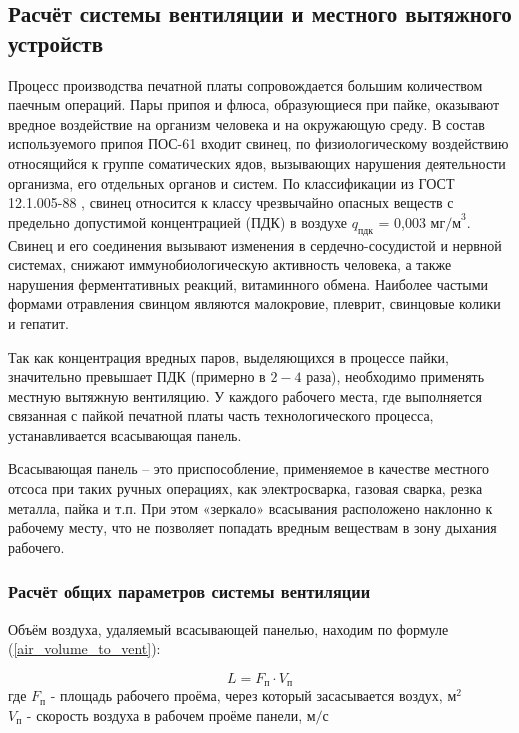 \newpage

\subsection{Расчёт системы вентиляции и местного вытяжного устройств}

Процесс производства печатной платы сопровождается большим количеством паечным
операций.
Пары припоя и флюса, образующиеся при пайке, оказывают вредное воздействие на
организм человека и на окружающую среду. В состав используемого припоя ПОС-61
входит свинец, по физиологическому воздействию относящийся к группе соматических
ядов, вызывающих нарушения деятельности организма, его отдельных органов и систем.
По классификации из ГОСТ 12.1.005-88 \cite{ecology_gost_005_88}, свинец относится
к классу чрезвычайно опасных веществ с предельно допустимой концентрацией (ПДК)
в воздухе $q_\text{пдк}$ = 0,003 $\text{мг/м}^3$.
Свинец и его соединения вызывают изменения в сердечно-сосудистой и нервной системах,
снижают иммунобиологическую активность человека, а также нарушения ферментативных
реакций, витаминного обмена. Наиболее частыми формами отравления свинцом являются
малокровие, плеврит, свинцовые колики и гепатит.

Так как концентрация вредных паров, выделяющихся в процессе пайки, значительно
превышает ПДК (примерно в $2 - 4$ раза), необходимо применять местную вытяжную вентиляцию.
У каждого рабочего места, где выполняется связанная с пайкой печатной платы часть
технологического процесса, устанавливается всасывающая панель.

Всасывающая панель – это приспособление, применяемое в качестве местного отсоса
при таких ручных операциях, как электросварка, газовая сварка, резка металла,
пайка и т.п. При этом «зеркало» всасывания расположено наклонно к рабочему месту,
что не позволяет попадать вредным веществам в зону дыхания рабочего.

\subsubsection{Расчёт общих параметров системы вентиляции}

Объём воздуха, удаляемый всасывающей панелью, находим по формуле
(\ref{air_volume_to_vent}):

\begin{equation}
\label{air_volume_to_vent}
    L = F_\text{п} \cdot V_\text{п}
\end{equation}
где $F_\text{п}$ - площадь рабочего проёма, через который засасывается воздух, $\text{м}^2$ \\
$V_\text{п}$ - скорость воздуха в рабочем проёме панели, $\text{м/с}$

